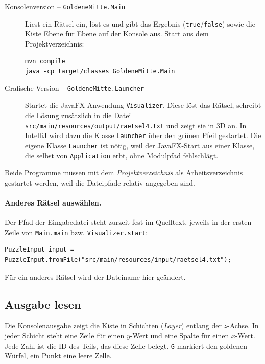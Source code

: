 \documentclass[11pt,a4paper,parskip=half]{scrartcl}
\newcommand{\code}[1]{\texttt{#1}}
\newcommand{\file}[1]{\texttt{#1}}
\begin{document}
\begin{description}
  \item[Konsolenversion -- \code{GoldeneMitte.Main}]
    Liest ein Rätsel ein, löst es und gibt das Ergebnis (\code{true}/\code{false})
    sowie die Kiste Ebene für Ebene auf der Konsole aus. Start aus dem
    Projektverzeichnis:
\begin{lstlisting}
mvn compile
java -cp target/classes GoldeneMitte.Main
\end{lstlisting}

  \item[Grafische Version -- \code{GoldeneMitte.Launcher}]
    Startet die JavaFX-Anwendung \code{Visualizer}. Diese löst das Rätsel, schreibt
    die Lösung zusätzlich in die Datei \file{src/main/resources/\allowbreak output/\allowbreak raetsel4.txt}
    und zeigt sie in 3D an. In IntelliJ wird dazu die Klasse \code{Launcher} über den
    grünen Pfeil gestartet. Die eigene Klasse \code{Launcher} ist nötig, weil der
    JavaFX-Start aus einer Klasse, die selbst von \code{Application} erbt, ohne
    Modulpfad fehlschlägt.
\end{description}

Beide Programme müssen mit dem \emph{Projektverzeichnis} als Arbeitsverzeichnis
gestartet werden, weil die Dateipfade relativ angegeben sind.

\paragraph{Anderes Rätsel auswählen.}
Der Pfad der Eingabedatei steht zurzeit fest im Quelltext, jeweils in der ersten Zeile
von \code{Main.main} bzw. \code{Visualizer.start}:
\begin{lstlisting}[style=java]
PuzzleInput input = PuzzleInput.fromFile("src/main/resources/input/raetsel4.txt");
\end{lstlisting}
Für ein anderes Rätsel wird der Dateiname hier geändert.

\subsection{Ausgabe lesen}

Die Konsolenausgabe zeigt die Kiste in Schichten (\emph{Layer}) entlang der
$z$-Achse. In jeder Schicht steht eine Zeile für einen $y$-Wert und eine Spalte für
einen $x$-Wert. Jede Zahl ist die ID des Teils, das diese Zelle belegt. \code{G}
markiert den goldenen Würfel, ein Punkt eine leere Zelle.
\end{document}
